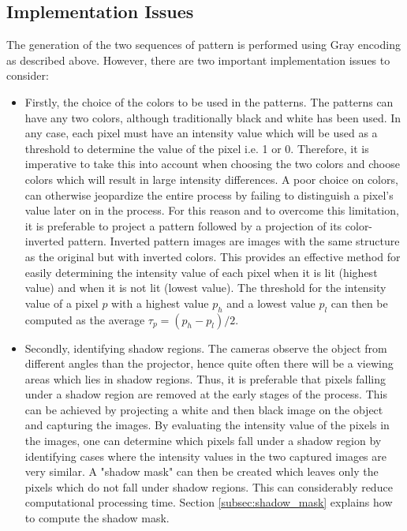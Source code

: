 \documentclass[final,12pt,3p]{elsarticle}
\begin{document}
\subsection{Implementation Issues}
The generation of the two sequences of pattern is performed using Gray encoding as described above. However, there are two important implementation issues to consider:
\begin{itemize}
	\item Firstly, the choice of the colors to be used in the patterns. The patterns can have any two colors, although traditionally black and white has been used. In any case, each pixel must have an intensity value which will be used as a threshold to determine the value of the pixel i.e. 1 or 0. Therefore, it is imperative to take this into account when choosing the two colors and choose colors which will result in large intensity differences. A poor choice on colors, can otherwise jeopardize the entire process by failing to distinguish a pixel's value later on in the process. 
	For this reason and to overcome this limitation, it is preferable to project a pattern followed by a projection of its color-inverted pattern. Inverted pattern images are images with the same structure as the original but with inverted colors. This provides an effective method for easily determining the intensity value of each pixel when it is lit (highest value) and when it is not lit (lowest value). The threshold for the intensity value of a pixel $p$ with a highest value $p_{h}$ and a lowest value $p_{l}$ can then be computed as the average $\tau_{p} = (p_{h} - p_{l})/2$. 
	
	\item Secondly, identifying shadow regions. The cameras observe the object from different angles than the projector, hence quite often there will be a viewing areas which lies in shadow regions. Thus, it is preferable that pixels falling under a shadow region are removed at the early stages of the process. This can be achieved by projecting a white and then black image on the object and capturing the images. By evaluating the intensity value of the pixels in the images, one can determine which pixels fall under a shadow region by identifying cases where the intensity values in the two captured images are very similar. A "shadow mask" can then be created which leaves only the pixels which do not fall under shadow regions. This can considerably reduce computational processing time. Section \ref{subsec:shadow_mask} explains how to compute the shadow mask.
\end{itemize}
\end{document}
